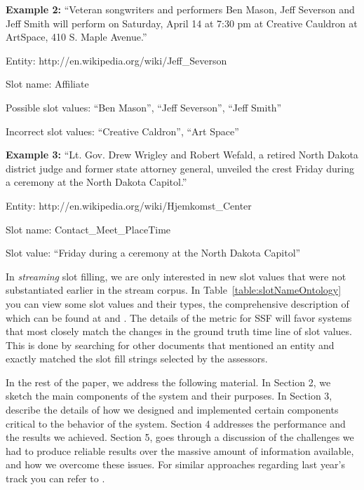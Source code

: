 \noindent \textbf{Example 2:} ``Veteran songwriters and performers Ben Mason, Jeff Severson and 
Jeff Smith will perform on Saturday, April 14 at 7:30 pm at Creative Cauldron 
at ArtSpace, 410 S. Maple Avenue.''

Entity: http://en.wikipedia.org/wiki/Jeff\_Severson

Slot name: Affiliate

Possible slot values: ``Ben Mason'', ``Jeff Severson'', ``Jeff Smith''

Incorrect slot values: ``Creative Caldron'', ``Art Space''

\noindent \textbf{Example 3:}  ``Lt. Gov. Drew Wrigley and Robert Wefald, a retired North Dakota 
district judge and former state attorney general, unveiled the crest Friday 
during a ceremony at the North Dakota Capitol.''

Entity: http://en.wikipedia.org/wiki/Hjemkomst\_Center

Slot name: Contact\_Meet\_PlaceTime

Slot value: ``Friday during a ceremony at the North Dakota Capitol''


\noindent In \textit{streaming} slot filling, we are only interested in new 
slot values that were not substantiated earlier in the stream corpus.
In Table~\ref{table:slotNameOntology} you can view some slot values 
and their types, the comprehensive description of which can be found at
\cite{tackbp} and \cite{aec}. The details of the metric for SSF will favor systems 
that most closely match the changes in the ground truth time line of slot values. 
This is done by searching for other documents that mentioned an entity and exactly 
matched the slot fill strings selected by the assessors.



In the rest of the paper, we address the following material. In Section 2, we 
sketch the main components of the system and their purposes. In Section 3, 
describe the details of how we designed and implemented certain components 
critical to the behavior of the system. Section 4 addresses the performance and 
the results we achieved. Section 5, goes through a discussion of the challenges we 
had to produce reliable results over the massive amount of information available, 
and how we overcome these issues. For similar approaches regarding last year's 
track you can refer to \cite{ji2011knowledge}.



